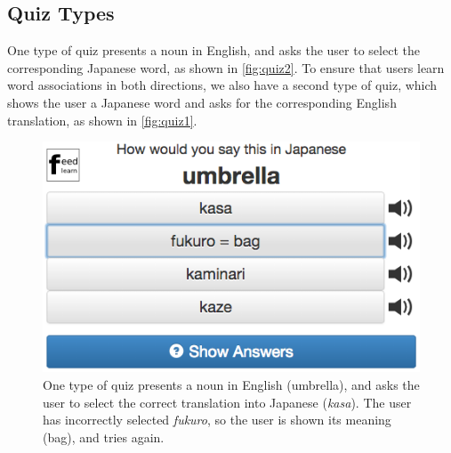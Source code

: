 \documentclass{sigchi}
\begin{document}
\pagebreak

\subsection{Quiz Types}

One type of quiz presents a noun in English, and asks the user to select the corresponding Japanese word, as shown in \autoref{fig:quiz2}. To ensure that users learn word associations in both directions, we also have a second type of quiz, which shows the user a Japanese word and asks for the corresponding English translation, as shown in \autoref{fig:quiz1}.

\begin{figure}
\centering
\includegraphics[width=1.0\columnwidth]{quiz2}
\caption{One type of quiz presents a noun in English (umbrella), and asks the user to select the correct translation into Japanese (\textit{kasa}). The user has incorrectly selected \textit{fukuro}, so the user is shown its meaning (bag), and tries again.}
\label{fig:quiz2}
\end{figure}
\end{document}
